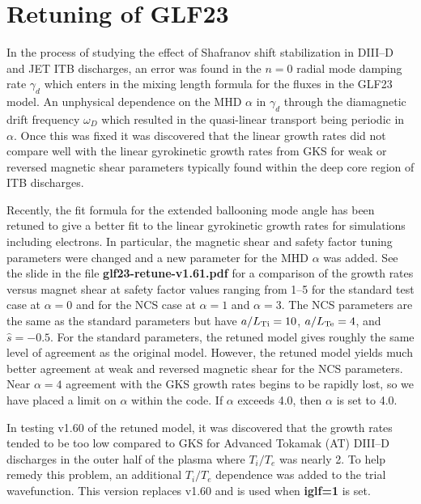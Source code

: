 \section{Retuning of GLF23}
In the process of studying the effect of Shafranov shift 
stabilization in DIII--D and JET ITB discharges, an error was 
found in the $n=0$  radial mode damping rate $\gamma_d$ which 
enters in the mixing length formula for the fluxes in the 
GLF23 model. An unphysical dependence on the MHD $\alpha$ 
in $\gamma_d$ through the diamagnetic drift frequency $\omega_D$ 
which resulted in the quasi-linear transport being periodic in 
$\alpha$. Once this was fixed it was discovered that the linear 
growth rates did not compare well with the linear gyrokinetic growth 
rates from GKS for weak or reversed magnetic shear parameters 
typically found within the deep core region of ITB discharges. 

Recently, the fit formula for the extended ballooning mode angle
has been retuned to give a better fit to the linear gyrokinetic
growth rates for simulations including electrons. In particular,
the magnetic shear and safety factor tuning parameters were
changed and a new parameter for the MHD $\alpha$ was added.
See the slide in the file {\bf glf23-retune-v1.61.pdf} for a comparison
of the growth rates versus magnet shear at safety factor values 
ranging from 1--5 for the standard test case at $\alpha=0$
and for the NCS case at $\alpha=1$ and $\alpha=3$.
The NCS parameters are the same as the standard parameters
but have $a/L_{\rm Ti}=10$, $a/L_{\rm Te}=4$, and $\hat{s}=-0.5$.
For the standard parameters, the retuned model gives
roughly the same level of agreement as the original model.
However, the retuned model yields much better agreement
at weak and reversed magnetic shear for the NCS parameters.
Near $\alpha=4$ agreement with the GKS growth rates begins
to be rapidly lost, so we have placed a limit on $\alpha$
within the code. If $\alpha$ exceeds 4.0, then $\alpha$
is set to 4.0.

In testing v1.60 of the retuned model, it was discovered
that the growth rates tended to be too low compared to GKS
for Advanced Tokamak (AT) DIII--D discharges in the outer
half of the plasma where $T_i/T_e$ was nearly 2. To help
remedy this problem, an additional $T_i/T_e$ dependence
was added to the trial wavefunction. This version replaces
v1.60 and is used when {\bf iglf=1} is set.

